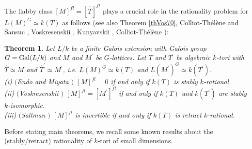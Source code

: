 \documentclass{amsart}
\theoremstyle{plain}
\newtheorem{theorem}{Theorem}[section]
\theoremstyle{definition}
\theoremstyle{remark}
\begin{document}
The flabby class $[M]^{fl}=[\widehat{T}]^{fl}$ 
plays a crucial role in the rationality problem 
for $L(M)^G\simeq k(T)$ %
as follows (see also %
Theorem \ref{thVos70}, 
Colliot-Th\'el\`ene and Sansuc \cite[Section 2]{CTS77}, 
Voskresenskii \cite[Section 4.6]{Vos98}, 
Kunyavskii \cite[Theorem 1.7]{Kun07}, 
Colliot-Th\'el\`ene \cite[Theorem 5.4]{CT07}): 
%
%
\begin{theorem}%
\label{thEM73}
Let $L/k$ be a finite Galois extension with Galois group $G={\rm Gal}(L/k)$ 
and $M$ and $M^\prime$ be $G$-lattices. 
Let $T$ and $T^\prime$ be algebraic $k$-tori with $\widehat{T}\simeq M$ 
and $\widehat{T}^\prime\simeq M^\prime$, 
i.e. $L(M)^G\simeq k(T)$ and $L(M^\prime)^G\simeq k(T^\prime)$.\\
{\rm (i)} $(${\rm Endo and Miyata} \cite[Theorem 1.6]{EM73}$)$ 
$[M]^{fl}=0$ if and only if $k(T)$ is stably $k$-rational.\\
{\rm (ii)} $(${\rm Voskresenskii} \cite[Theorem 2]{Vos74}$)$ 
$[M]^{fl}=[M^\prime]^{fl}$ if and only if $k(T)$ and $k(T^\prime)$ 
are stably $k$-isomorphic.\\
{\rm (iii)} $(${\rm Saltman} \cite[Theorem 3.14]{Sal84}$)$ 
$[M]^{fl}$ is invertible if and only if $k(T)$ is 
retract $k$-rational.
\end{theorem}

%
Before stating main theorems, we recall some known results 
about the (stably/retract) rationality of $k$-tori of small dimensions.
\end{document}
